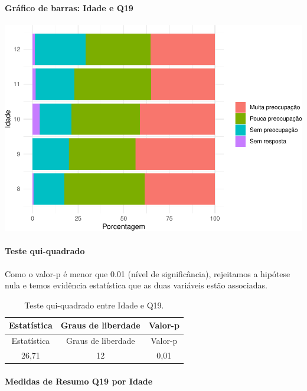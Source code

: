 \documentclass[]{article}
\let\oldparagraph\paragraph
\renewcommand{\paragraph}[1]{\oldparagraph{#1}\mbox{}}
\begin{document}
\hypertarget{gruxe1fico-de-barras-idade-e-q19}{%
\paragraph{Gráfico de barras: Idade e Q19}\label{gruxe1fico-de-barras-idade-e-q19}}

\begin{center}\includegraphics[width=0.75\linewidth]{relatorio_covid19_files/figure-latex/unnamed-chunk-329-1} \end{center}

\hypertarget{teste-qui-quadrado-29}{%
\paragraph{Teste qui-quadrado}\label{teste-qui-quadrado-29}}

Como o valor-p é menor que 0.01 (nível de significância), rejeitamos a hipótese nula e temos evidência estatística que as duas variáveis estão associadas.

\begin{longtable}[]{@{}ccc@{}}
\caption{\label{tab:unnamed-chunk-331}Teste qui-quadrado entre Idade e Q19.}\tabularnewline
\toprule
Estatística & Graus de liberdade & Valor-p\tabularnewline
\midrule
\endfirsthead
\toprule
Estatística & Graus de liberdade & Valor-p\tabularnewline
\midrule
\endhead
26,71 & 12 & 0,01\tabularnewline
\bottomrule
\end{longtable}

\cleardoublepage

\hypertarget{medidas-de-resumo-q19-por-idade}{%
\paragraph{Medidas de Resumo Q19 por Idade}\label{medidas-de-resumo-q19-por-idade}}
\end{document}

